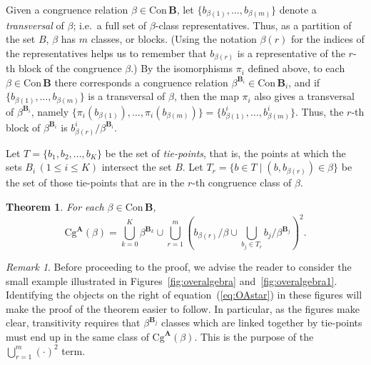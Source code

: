 \documentclass[cm,dissertation]{uhthesis}
\theoremstyle{plain}
\newtheorem{theorem}{Theorem}[section]
\theoremstyle{definition}
\theoremstyle{remark}
\newtheorem*{remark}{Remark}
\numberwithin{theorem}{section}
\numberwithin{claim}{chapter}
\numberwithin{equation}{section}
\numberwithin{conjecture}{chapter}
\newcommand{\<}{\ensuremath{\langle}}
\renewcommand{\>}{\ensuremath{\rangle}}
\renewcommand{\leq}{\ensuremath{\leqslant}}
\newcommand{\Cg}{\ensuremath{\mathrm{Cg}}}
\newcommand{\Con}{\ensuremath{\mathrm{Con\,}}}
\newcommand{\0}{\ensuremath{\mathbf{0}}}
\newcommand{\1}{\ensuremath{\mathbf{1}}}
\newcommand{\2}{\ensuremath{\mathbf{2}}}
\newcommand{\3}{\ensuremath{\mathbf{3}}}
\newcommand{\4}{\ensuremath{\mathbf{4}}}
\newcommand{\5}{\ensuremath{\mathbf{5}}}
\newcommand{\bA}{\ensuremath{\mathbf{A}}}
\newcommand{\bB}{\ensuremath{\mathbf{B}}}
\newcommand{\bBi}{\ensuremath{\mathbf{B}_i}}
\begin{document}
Given a congruence relation $\beta \in \Con \bB$, let 
$\{b_{\beta(1)}, \dots, b_{\beta(m)}\}$ denote a \emph{transversal} of $\beta$;
i.e.~a full set of $\beta$-class representatives.  
Thus, as a partition of the set $B$, $\beta$ has $m$
classes, or blocks.  (Using the notation $\beta(r)$ for the indices of the
representatives helps us to remember that $b_{\beta(r)}$ is a representative of the
$r$-th block of the congruence $\beta$.)
By the isomorphisms $\pi_i$ defined above, to each
$\beta \in \Con \bB$  there corresponds a congruence relation 
$\beta^{\bBi} \in \Con \bB_i$, and if
$\{b_{\beta(1)}, \dots, b_{\beta(m)}\}$ is a transversal of $\beta$, then 
the map $\pi_i$ also gives a transversal of $\beta^{\bBi}$, namely
$\{\pi_i(b_{\beta(1)}), \dots, \pi_i(b_{\beta(m)})\}
=\{b^i_{\beta(1)}, \dots, b^i_{\beta(m)}\}$.  
Thus, the $r$-th block of $\beta^{\bBi}$ is $b^i_{\beta(r)}/\beta^{\bBi}$.

Let $T = \{b_1, b_2, \dots, b_K\}$ be the set of \emph{tie-points}, that is, the
points at which the sets $B_i\, (1\leq i\leq K)$ intersect the set $B$.
Let $T_r = \{b\in T \mid (b, b_{\beta(r)}) \in \beta\}$ be the set of those
tie-points that are in the $r$-th congruence class of $\beta$.
\begin{theorem}
  \label{OAthm1}
  For each $\beta \in \Con \bB$, 
  \begin{equation}
    \label{eq:OAstar}
    \Cg^\bA(\beta) = \bigcup_{k=0}^K \beta^{\bB_k} \cup \bigcup_{r=1}^m 
    \left(b_{\beta(r)}/\beta \cup \bigcup_{b_j\in T_r} b_j/\beta^{\bB_j}\right)^2.
  \end{equation}
\end{theorem}

\begin{remark}
  Before proceeding to the proof, we advise the reader to consider the small
  example illustrated in Figures~\ref{fig:overalgebra}
  and~\ref{fig:overalgebra1}.  Identifying the objects on the right of
  equation~(\ref{eq:OAstar}) in these figures will make the proof of the theorem
  easier to follow.
  In particular, as the figures make clear, transitivity requires that
  $\beta^{\bB_j}$ classes which are linked together by tie-points must end up in
  the same class of $\Cg^\bA(\beta)$.  This is the purpose of the
  $\bigcup\limits_{r=1}^m (\cdot)^2$ term. 
\end{remark}
\end{document}
